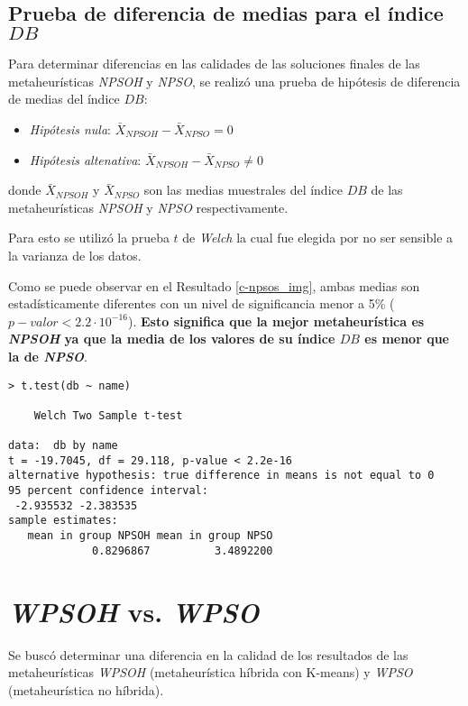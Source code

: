 \subsection{Prueba de diferencia de medias para el índice $DB$}

    Para determinar diferencias en las calidades de las soluciones finales de las
metaheurísticas \emph{NPSOH} y \emph{NPSO}, se realizó una prueba de hipótesis de
diferencia de medias del índice $DB$:
\begin{itemize}
    \item \emph{Hipótesis nula}: $\bar{X}_{NPSOH} - \bar{X}_{NPSO} = 0$
    \item \emph{Hipótesis altenativa}: $\bar{X}_{NPSOH} - \bar{X}_{NPSO} \neq 0$
\end{itemize}
donde $\bar{X}_{NPSOH}$ y $\bar{X}_{NPSO}$ son las medias muestrales del índice
$DB$ de las metaheurísticas \emph{NPSOH} y \emph{NPSO} respectivamente.

    Para esto se utilizó la prueba $t$ de \emph{Welch} \cite{AB_0} la cual fue
elegida por no ser sensible a la varianza de los datos.

	Como se puede observar en el Resultado \ref{c-npsos_img}, ambas medias son
estadísticamente diferentes con un nivel de significancia menor a 5\%
($p-valor < 2.2 \cdot 10^{-16}$). { \bf Esto significa que la mejor metaheurística
es \emph{NPSOH} ya que la media de los valores de su índice $DB$ es menor que la
de \emph{NPSO}}.

\begin{lstlisting}[float=h!, caption={Diferencia de Medias: Índice \emph{DB}}, label=c-npsos_img]
> t.test(db ~ name)

	Welch Two Sample t-test

data:  db by name 
t = -19.7045, df = 29.118, p-value < 2.2e-16
alternative hypothesis: true difference in means is not equal to 0 
95 percent confidence interval:
 -2.935532 -2.383535 
sample estimates:
   mean in group NPSOH mean in group NPSO
             0.8296867          3.4892200
\end{lstlisting}

\section{\emph{WPSOH} vs. \emph{WPSO}}

	Se buscó determinar una diferencia en la calidad de los resultados de las
metaheurísticas \emph{WPSOH} (metaheurística híbrida con K-means) y
\emph{WPSO} (metaheurística no híbrida).

